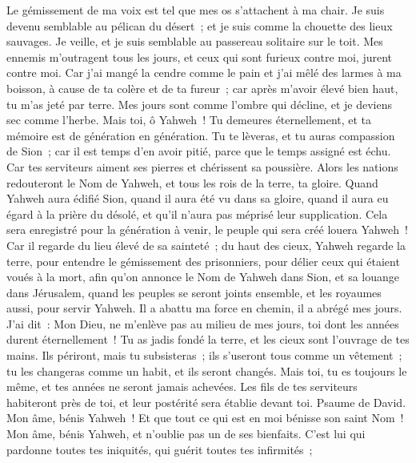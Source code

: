 \begin{multicols}{2}
Le gémissement de ma voix est tel que mes os s'attachent à ma chair.
Je suis devenu semblable au pélican du désert~; et je suis comme la chouette des lieux sauvages.
Je veille, et je suis semblable au passereau solitaire sur le toit.
Mes ennemis m'outragent tous les jours, et ceux qui sont furieux contre moi, jurent contre moi.
Car j'ai mangé la cendre comme le pain et j'ai mêlé des larmes à ma boisson,
à cause de ta colère et de ta fureur~; car après m'avoir élevé bien haut, tu m'as jeté par terre.
Mes jours sont comme l'ombre qui décline, et je deviens sec comme l'herbe.
Mais toi, ô Yahweh~! Tu demeures éternellement, et ta mémoire est de génération en génération.
Tu te lèveras, et tu auras compassion de Sion~; car il est temps d'en avoir pitié, parce que le temps assigné est échu.
Car tes serviteurs aiment ses pierres et chérissent sa poussière.
Alors les nations redouteront le Nom de Yahweh, et tous les rois de la terre, ta gloire.
Quand Yahweh aura édifié Sion, quand il aura été vu dans sa gloire,
quand il aura eu égard à la prière du désolé, et qu'il n'aura pas méprisé leur supplication.
Cela sera enregistré pour la génération à venir, le peuple qui sera créé louera Yahweh~!
Car il regarde du lieu élevé de sa sainteté~; du haut des cieux, Yahweh regarde la terre,
pour entendre le gémissement des prisonniers, pour délier ceux qui étaient voués à la mort,
afin qu'on annonce le Nom de Yahweh dans Sion, et sa louange dans Jérusalem,
quand les peuples se seront joints ensemble, et les royaumes aussi, pour servir Yahweh.
Il a abattu ma force en chemin, il a abrégé mes jours.
J'ai dit~: Mon Dieu, ne m'enlève pas au milieu de mes jours, toi dont les années durent éternellement~!
Tu as jadis fondé la terre, et les cieux sont l'ouvrage de tes mains.
Ils périront, mais tu subsisteras~; ils s'useront tous comme un vêtement~; tu les changeras comme un habit, et ils seront changés.
Mais toi, tu es toujours le même, et tes années ne seront jamais achevées.
Les fils de tes serviteurs habiteront près de toi, et leur postérité sera établie devant toi.
\VerseOne{}Psaume de David. Mon âme, bénis Yahweh~! Et que tout ce qui est en moi bénisse son saint Nom~!
Mon âme, bénis Yahweh, et n'oublie pas un de ses bienfaits.
C'est lui qui pardonne toutes tes iniquités, qui guérit toutes tes infirmités~;

\end{multicols}
